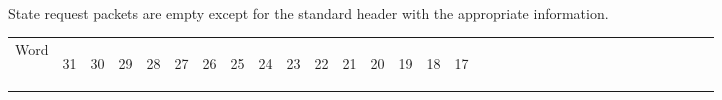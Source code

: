 \documentclass[11pt]{article}
\begin{document}
\paragraph{}
State request packets are empty except for the standard header with the appropriate information.
\newline
\begin{table}[h]
    \centering
    \label{tab:stateReqestDef}
    \begin{tabular}{|p{1cm}|m{0.04cm}|m{0.04cm}|m{0.04cm}|m{0.04cm}|m{0.04cm}|m{0.04cm}|m{0.04cm}|m{0.04cm}|m{0.04cm}|
        m{0.04cm}|m{0.04cm}|m{0.04cm}|m{0.04cm}|m{0.04cm}|m{0.04cm}|m{0.04cm}|m{0.04cm}|m{0.04cm}|m{0.04cm}|m{0.04cm}|
        m{0.04cm}|m{0.04cm}|m{0.04cm}|m{0.04cm}|m{0.04cm}|m{0.04cm}|m{0.04cm}|m{0.04cm}|m{0.04cm}|m{0.04cm}|m{0.04cm}|m{0.04cm}|}
        \hline
        Word & 
        \begin{sideways}31\end{sideways} &
        \begin{sideways}30\end{sideways} & 
        \begin{sideways}29\end{sideways} &
        \begin{sideways}28\end{sideways} &
        \begin{sideways}27\end{sideways} &
        \begin{sideways}26\end{sideways} &
        \begin{sideways}25\end{sideways} &
        \begin{sideways}24\end{sideways} &
        \begin{sideways}23\end{sideways} &
        \begin{sideways}22\end{sideways} &
        \begin{sideways}21\end{sideways} &
        \begin{sideways}20\end{sideways} &
        \begin{sideways}19\end{sideways} &
        \begin{sideways}18\end{sideways} &
        \begin{sideways}17\end{sideways} &

\end{tabular}
\end{table}
\end{document}
